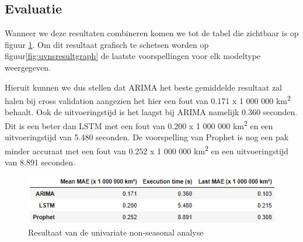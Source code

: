 \clearpage
\subsection{Evaluatie}

Wanneer we deze resultaten combineren komen we tot de tabel die zichtbaar is op figuur \ref{fig:uvnsresult}. Om dit resultaat grafisch te schetsen worden op figuur\ref{fig:uvnsresultgraph} de laatste voorspellingen voor elk modeltype weergegeven.

Hieruit kunnen we dus stellen dat ARIMA het beste gemiddelde resultaat zal halen bij cross validation aangezien het hier een fout van 0.171 x 1 000 000 km\textsuperscript{2} behaalt. Ook de uitvoeringstijd is het laagst bij ARIMA namelijk 0.360 seconden. Dit is een beter dan LSTM met een fout van 0.200 x 1 000 000 km\textsuperscript{2} en een uitvoeringstijd van 5.480 seconden. De voorspelling van Prophet is nog een pak minder accuraat met een fout van 0.252 x 1 000 000 km\textsuperscript{2} en een uitvoeringstijd van 8.891 seconden.


\begin{figure}
    \centering
    \caption{Resultaat van de univariate non-seasonal analyse}
    \label{fig:uvnsresult}
    \includegraphics[width=0.7\linewidth]{uv_ns_result}
\end{figure}


